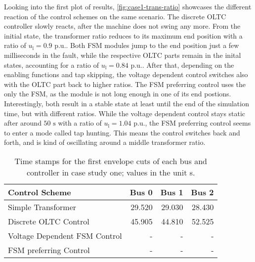 {}
Looking into the first plot of results, \autoref{fig:case1-trans-ratio} showcases the different reaction of the control schemes on the same scenario.
The discrete \acs{OLTC} controller slowly reacts, after the machine does not swing any more.
From the initial state, the transformer ratio reduces to its maximum end position with a ratio of $u_\mathrm{l}=0.9\text{ p.u.}$.
Both \acs{FSM} modules jump to the end position just a few milliseconds in the fault, while the respective \acs{OLTC} parts remain in the inital states, accounting for a ratio of $u_\mathrm{l}=0.84\text{ p.u.}$.
After that, depending on the enabling functions and tap skipping, the voltage dependent control switches also with the \acs{OLTC} part back to higher ratios.
The \acs{FSM} preferring control uses the only the \acs{FSM}, as the module is not long enough in one of its end postions.
Interestingly, both result in a stable state at least until the end of the simulation time, but with different ratios.
While the voltage dependent control stays static after around $50\text{ s}$ with a ratio of $u_\mathrm{l}=1.04\text{ p.u.}$, the \acs{FSM} preferring control seems to enter a mode called tap hunting.
This means the control switches back and forth, and is kind of oscillating around a middle transformer ratio.

\begin{table}[htbp!]
    \caption[Time stamps for the first envelope cuts of each bus and controller in case study one]{Time stamps for the first envelope cuts of each bus and controller in case study one; values in the unit s.}
    \label{tab:case1-critical-times}
    \vspace*{12pt}
    \centering
    \small
    \begin{tabularx}{\textwidth}{Xrrr}
        \textbf{Control Scheme} & \textbf{Bus 0} & \textbf{Bus 1} & \textbf{Bus 2} \\ \hline
        \toprule
        Simple Transformer                  & 29.520 & 29.030 & 28.430 \\
        Discrete \acs{OLTC} Control         & 45.905 & 44.810 & 52.525 \\
        Voltage Dependent \acs{FSM} Control & - & - & - \\
        \acs{FSM} preferring Control        & - & - & -  \\
        \bottomrule
    \end{tabularx}
\end{table}

